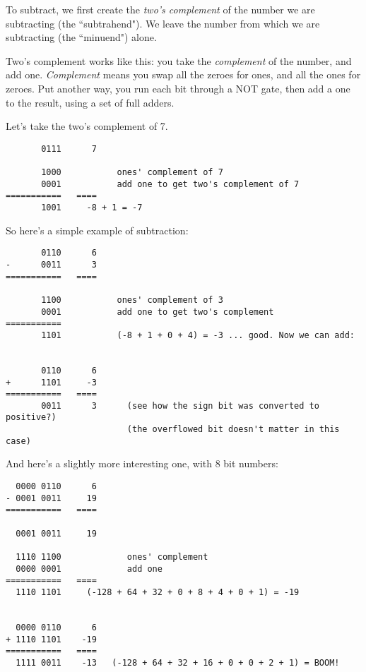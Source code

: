 To subtract, we first create the \emph{two's complement} of the number we are subtracting (the ``subtrahend"). We leave the number from which we are subtracting (the ``minuend") alone.

Two's complement works like this: you take the \emph{complement} of the number, and add one. \emph{Complement} means you swap all the zeroes for ones, and all the ones for zeroes. Put another way, you run each bit through a NOT gate, then add a one to the result, using a set of full adders.

Let's take the two's complement of 7.

\begin{verbatim}
       0111      7

       1000           ones' complement of 7
       0001           add one to get two's complement of 7
===========   ====
       1001     -8 + 1 = -7 

\end{verbatim}

So here's a simple example of subtraction:

\begin{verbatim}
       0110      6
-      0011      3
===========   ====

       1100           ones' complement of 3
       0001           add one to get two's complement
===========	   
       1101           (-8 + 1 + 0 + 4) = -3 ... good. Now we can add:


       0110      6
+      1101     -3
===========   ====
       0011      3      (see how the sign bit was converted to positive?)
                        (the overflowed bit doesn't matter in this case)

\end{verbatim}

\newpage
And here's a slightly more interesting one, with 8 bit numbers:

\begin{verbatim}
  0000 0110      6
- 0001 0011     19
===========   ====

  0001 0011     19
  
  1110 1100             ones' complement
  0000 0001             add one
===========   ====
  1110 1101     (-128 + 64 + 32 + 0 + 8 + 4 + 0 + 1) = -19


  0000 0110      6
+ 1110 1101    -19
===========   ====
  1111 0011    -13   (-128 + 64 + 32 + 16 + 0 + 0 + 2 + 1) = BOOM! 
  
\end{verbatim}

